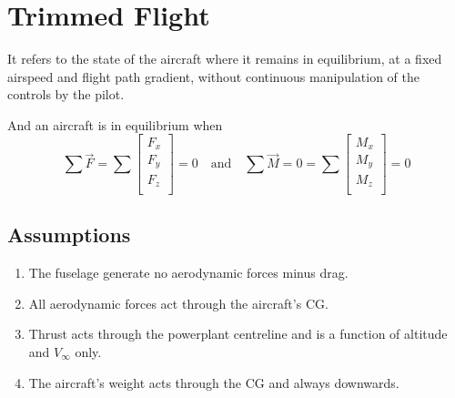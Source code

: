 \section{Trimmed Flight}
It refers to the state of the aircraft where it remains in equilibrium, at a fixed airspeed and flight path gradient, without continuous manipulation of the controls by the pilot.

And an aircraft is in equilibrium when
\begin{equation}
  \sum \vec{F} = \sum \begin{bmatrix} F_x \\ F_y\\ F_z \\\end{bmatrix}= 0 
  \quad\text{and}\quad 
  \sum \vec{M} = 0 = \sum \begin{bmatrix} M_x \\ M_y\\ M_z \\\end{bmatrix}= 0 
\end{equation}
\subsection{Assumptions}
\begin{enumerate}
  \item The fuselage generate no aerodynamic forces minus drag.
  \item All aerodynamic forces act through the aircraft's CG.
  \item Thrust acts through the powerplant centreline and is a function of altitude and $V_{\infty}$ only.
  \item The aircraft's weight acts through the CG and always downwards.
\end{enumerate}

